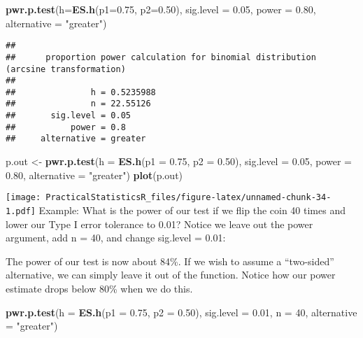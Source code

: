 \documentclass[]{article}
\newenvironment{Shaded}{\begin{snugshade}}{\end{snugshade}}
\newcommand{\DataTypeTok}[1]{\textcolor[rgb]{0.13,0.29,0.53}{#1}}
\newcommand{\DecValTok}[1]{\textcolor[rgb]{0.00,0.00,0.81}{#1}}
\newcommand{\FloatTok}[1]{\textcolor[rgb]{0.00,0.00,0.81}{#1}}
\newcommand{\KeywordTok}[1]{\textcolor[rgb]{0.13,0.29,0.53}{\textbf{#1}}}
\newcommand{\NormalTok}[1]{#1}
\newcommand{\StringTok}[1]{\textcolor[rgb]{0.31,0.60,0.02}{#1}}
\begin{document}
\begin{Shaded}
\begin{Highlighting}[]
\KeywordTok{pwr.p.test}\NormalTok{(}\DataTypeTok{h=}\KeywordTok{ES.h}\NormalTok{(}\DataTypeTok{p1=}\FloatTok{0.75}\NormalTok{, }\DataTypeTok{p2=}\FloatTok{0.50}\NormalTok{), }
           \DataTypeTok{sig.level =} \FloatTok{0.05}\NormalTok{,}
           \DataTypeTok{power =} \FloatTok{0.80}\NormalTok{, }
           \DataTypeTok{alternative =} \StringTok{"greater"}\NormalTok{)}
\end{Highlighting}
\end{Shaded}

\begin{verbatim}
## 
##      proportion power calculation for binomial distribution (arcsine transformation) 
## 
##               h = 0.5235988
##               n = 22.55126
##       sig.level = 0.05
##           power = 0.8
##     alternative = greater
\end{verbatim}

\begin{Shaded}
\begin{Highlighting}[]
\NormalTok{p.out <-}\StringTok{ }\KeywordTok{pwr.p.test}\NormalTok{(}\DataTypeTok{h =} \KeywordTok{ES.h}\NormalTok{(}\DataTypeTok{p1 =} \FloatTok{0.75}\NormalTok{, }\DataTypeTok{p2 =} \FloatTok{0.50}\NormalTok{),}
                    \DataTypeTok{sig.level =} \FloatTok{0.05}\NormalTok{,}
                    \DataTypeTok{power =} \FloatTok{0.80}\NormalTok{,}
                    \DataTypeTok{alternative =} \StringTok{"greater"}\NormalTok{)}
\KeywordTok{plot}\NormalTok{(p.out)}
\end{Highlighting}
\end{Shaded}

\texttt{[image: PracticalStatisticsR\_files/figure-latex/unnamed-chunk-34-1.pdf]}
Example: What is the power of our test if we flip the coin 40 times and
lower our Type I error tolerance to 0.01? Notice we leave out the power
argument, add n = 40, and change sig.level = 0.01:

The power of our test is now about 84\%. If we wish to assume a
``two-sided'' alternative, we can simply leave it out of the function.
Notice how our power estimate drops below 80\% when we do this.

\begin{Shaded}
\begin{Highlighting}[]
\KeywordTok{pwr.p.test}\NormalTok{(}\DataTypeTok{h =} \KeywordTok{ES.h}\NormalTok{(}\DataTypeTok{p1 =} \FloatTok{0.75}\NormalTok{, }\DataTypeTok{p2 =} \FloatTok{0.50}\NormalTok{),}
           \DataTypeTok{sig.level =} \FloatTok{0.01}\NormalTok{,}
           \DataTypeTok{n =} \DecValTok{40}\NormalTok{,}
           \DataTypeTok{alternative =} \StringTok{"greater"}\NormalTok{)}
\end{Highlighting}
\end{Shaded}
\end{document}
